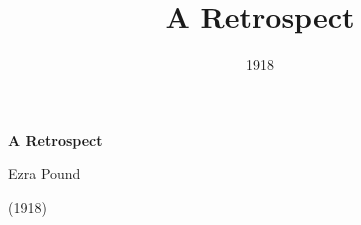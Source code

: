 \title{A Retrospect}
\author{}
\date{1918}


\renewcommand{\chaptername}{Pound, A Retrospect}

\thispagestyle{plain}


\begin{raggedright}
{\Large \linespread{1.0} \noindent \textbf{A Retrospect} \par} 

{\large Ezra Pound \par} 

\vspace{0.5em}
\end{raggedright}

\begin{raggedleft}
{\large \linespread{1.2} (1918) \par}
\end{raggedleft}
\vspace{1em}









